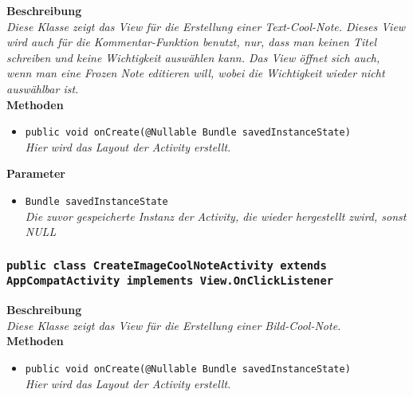 \documentclass[a4paper]{scrreprt}
\begin{document}
               	\textbf{Beschreibung} \\
      	        \textit{Diese Klasse zeigt das View für die Erstellung einer Text-Cool-Note. Dieses View wird auch für die Kommentar-Funktion benutzt, nur, dass man keinen Titel schreiben und keine Wichtigkeit auswählen kann. Das View öffnet sich auch, wenn man eine Frozen Note editieren will, wobei die Wichtigkeit wieder nicht auswählbar ist.} \\
                
                \textbf{Methoden}
                \begin{itemize}
        		\item\texttt{{public void onCreate(@Nullable Bundle savedInstanceState)}}\\
                \textit{Hier wird das Layout der Activity erstellt.}\\
                \end{itemize}
                
                \textbf{Parameter}
                \begin{itemize}
        		\item\texttt{Bundle savedInstanceState}\\  
                \textit{Die zuvor gespeicherte Instanz der Activity, die wieder hergestellt zwird, sonst NULL}\\
                \end{itemize} 
          
         
     	\subsubsection{\texttt{public class CreateImageCoolNoteActivity extends AppCompatActivity implements View.OnClickListener}}
               
               	\textbf{Beschreibung} \\
      	        \textit{Diese Klasse zeigt das View für die Erstellung einer Bild-Cool-Note.} \\
                
                \textbf{Methoden}
                \begin{itemize}
        		\item\texttt{{public void onCreate(@Nullable Bundle savedInstanceState)}}\\
                \textit{Hier wird das Layout der Activity erstellt.}\\
                \end{itemize}
                
\end{document}
